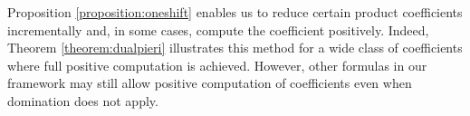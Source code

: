 \documentclass[reqno]{amsart}
\theoremstyle{definition}
\newtheorem{example}[lemma]{Example}
\theoremstyle{remark}
\numberwithin{equation}{subsection}
\newcommand{\cperm}[1]{\llbracket #1\rrbracket}
\newcommand{\shifthom}{\tau}
\newcommand{\shiftvby}[1]{\shifthom^{#1}}
\begin{document}
Proposition \ref{proposition:oneshift} enables us to reduce certain product coefficients incrementally and, in some cases, compute the coefficient positively. Indeed, Theorem \ref{theorem:dualpieri} illustrates this method for a wide class of coefficients where full positive computation is achieved. However, other formulas in our framework may still allow positive computation of coefficients even when domination does not apply.

\end{document}
